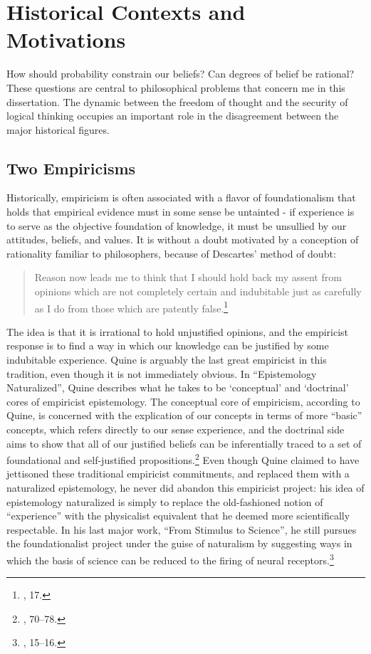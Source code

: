 \hypertarget{historical-context}{%
\section{Historical Contexts and Motivations}\label{historical-context}}

How should probability constrain our beliefs? Can degrees of belief be
rational? These questions are central to philosophical problems that concern me in this dissertation. The dynamic between the freedom of thought and the security of logical thinking occupies an important role in the disagreement between the major historical figures.

\subsection{Two Empiricisms}\label{empiricisms}


Historically, empiricism is often associated with a flavor of
foundationalism that holds that empirical evidence must in some sense be
untainted - if experience is to serve as the objective foundation of
knowledge, it must be unsullied by our attitudes, beliefs, and values.
It is without a doubt motivated by a conception of rationality familiar
to philosophers, because of Descartes' method of doubt:

\begin{quote}
Reason now leads me to think that I should hold back my assent from
opinions which are not completely certain and indubitable just as
carefully as I do from those which are patently false.\footnote{\cite{med}, 17.}
\end{quote}

The idea is that it is irrational to hold unjustified opinions, and the
empiricist response is to find a way in which our knowledge can be
justified by some indubitable experience. Quine is arguably the last
great empiricist in this tradition, even though it is not immediately
obvious. In ``Epistemology Naturalized'', Quine describes what he takes to
be `conceptual' and `doctrinal' cores of empiricist epistemology. The
conceptual core of empiricism, according to Quine, is concerned with the
explication of our concepts in terms of more ``basic'' concepts, which
refers directly to our sense experience, and the doctrinal side aims to
show that all of our justified beliefs can be inferentially traced to a
set of foundational and self-justified propositions.\footnote{\cite{epistnat}, 70--78.}
Even though Quine claimed to have jettisoned these traditional
empiricist commitments, and replaced them with a naturalized
epistemology, he never did abandon this empiricist project:
his idea of epistemology naturalized is simply to replace the
old-fashioned notion of ``experience'' with the physicalist equivalent that he
deemed more scientifically respectable. In his last major work, ``From
Stimulus to Science'', he still pursues the foundationalist project
under the guise of naturalism by suggesting ways in which the basis
of science can be reduced to the firing of neural receptors.\footnote{\cite{quinefromstim}, 15--16.}

